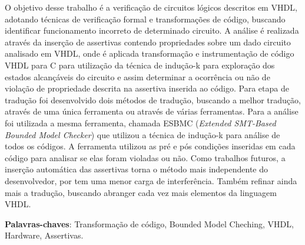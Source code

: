 O objetivo desse trabalho é a verificação de circuitos lógicos descritos em VHDL, adotando técnicas de verificação formal e transformações de código, buscando identificar funcionamento incorreto de determinado circuito. A análise é realizada através da inserção de assertivas contendo propriedades sobre um dado circuito analisado em VHDL, onde é aplicada transformação e instrumentação de código VHDL para C para utilização da técnica de indução-k para exploração dos estados alcançáveis do circuito e assim determinar a ocorrência ou não de violação de propriedade descrita na assertiva inserida ao código. Para etapa de tradução foi desenvolvido dois métodos de tradução, buscando a melhor tradução, através de uma única ferramenta ou através de várias ferramentas. Para a análise foi utilizada a mesma ferramenta, chamada ESBMC (\textit{Extended SMT-Based Bounded Model Checker}) que utilizou a técnica de indução-k para análise de todos os códigos. A ferramenta utilizou as pré e pós condições inseridas em cada código para analisar se elas foram violadas ou não.
Como trabalhos futuros, a inserção automática das assertivas torna o método mais independente do desenvolvedor, por tem uma menor carga de interferência. Também refinar ainda mais a tradução, buscando abranger cada vez mais elementos da linguagem VHDL.
\vspace{\onelineskip}
\noindent
\par
\textbf{Palavras-chaves}: Transformação de código, Bounded Model Cheching, VHDL, Hardware, Assertivas.